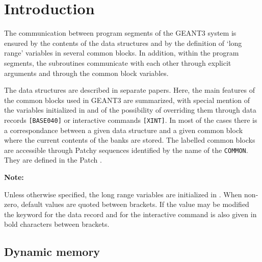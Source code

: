       
  
\section{Introduction}
 
The communication between program segments of the GEANT3 system
is ensured by the contents of the data structures and by the definition
of `long range' variables in several common blocks.
In addition, within the program segments,
the subroutines communicate with each other through explicit arguments
and through the common block variables.
 
The data structures are described in separate papers. Here, the
main features of the common blocks used in GEANT3 are summarized,
with special mention of the variables initialized in 
and of the possibility of overriding them through data records
{\tt [BASE040]} or interactive commands {\tt [XINT]}.
In most of the cases there is a correspondance between a
given data structure and a given common block where the current contents of
the banks are stored.
The labelled common blocks are accessible through Patchy sequences
identified by the name of the {\tt COMMON}. They are defined in the Patch
.
 
{\bf Note:}
 
Unless otherwise specified, the long range variables are
initialized in . When non-zero, default values are
quoted between brackets. If the value may be modified
the keyword for the data record and for the interactive
command is also given in bold characters between brackets.
 
\subsection{Dynamic memory}
 
